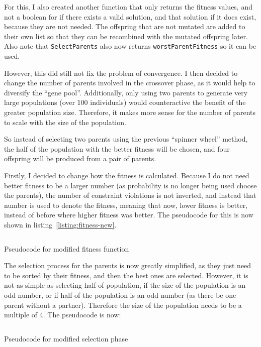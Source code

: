\documentclass[a4paper, 12pt]{report}
\begin{document}
For this, I also created another function that only returns the fitness values, 
and not a boolean for if there exists a valid solution, and that solution if it
does exist, because they are not needed.
The offspring that are not mutated are added to their own list so that they can
be recombined with the mutated offspring later.
Also note that \verb|SelectParents| also now returns \verb|worstParentFitness| 
so it can be used.

However, this did still not fix the problem of convergence. 
I then decided to change the number of parents involved in the crossover phase,
as it would help to diversify the ``gene pool''.
Additionally, only using two parents to generate very large populations (over 
100 individuals) would counteractive the benefit of the greater population size.
Therefore, it makes more sense for the number of parents to scale with the size
of the population.

So instead of selecting two parents using the previous ``spinner wheel'' method,
the half of the population with the better fitness will be chosen, and four 
offspring will be produced from a pair of parents.

Firstly, I decided to change how the fitness is calculated.
Because I do not need better fitness to be a larger number (as probability is no
longer being used choose the parents), the number of constraint violations is
not inverted, and instead that number is used to denote the fitness, meaning
that now, lower fitness is better, instead of before where higher fitness was 
better.
The pseudocode for this is now shown in listing~\ref*{listing:fitness-new}.

\begin{listing}[!ht]
	\inputminted[linenos, fontsize=\footnotesize]{text}{code/fitness-new.txt}
	\caption{Pseudocode for modified fitness function}
	\label{listing:fitness-new}
\end{listing}

The selection process for the parents is now greatly simplified, as they just
need to be sorted by their fitness, and then the best ones are selected.
However, it is not as simple as selecting half of population, if the size of the
population is an odd number, or if half of the population is an odd number (as 
there be one parent without a partner).
Therefore the size of the population needs to be a multiple of 4.
The pseudocode is now:

\begin{listing}[!ht]
	\inputminted[linenos, fontsize=\footnotesize]{text}{code/selection-new.txt}
	\caption{Pseudocode for modified selection phase}
	\label{listing:selection-new}
\end{listing}
\end{document}
